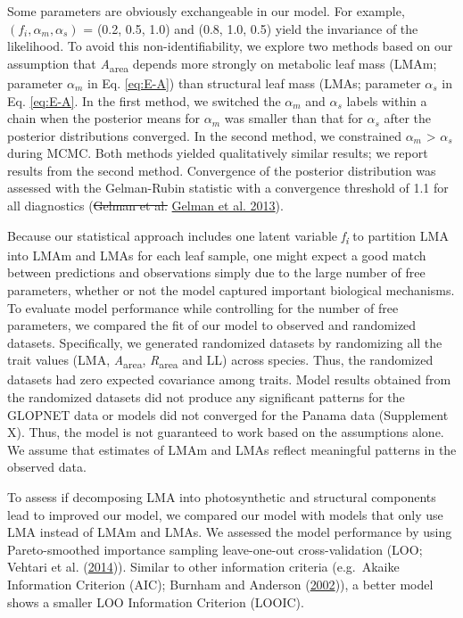 \documentclass[
  12pt,
]{article}
\providecommand{\DIFdeltex}[1]{{\protect\color{red}\sout{#1}}}                      %
\providecommand{\DIFaddbegin}{} %
\providecommand{\DIFaddend}{} %
\providecommand{\DIFdelbegin}{} %
\providecommand{\DIFdelend}{} %
\providecommand{\DIFdel}[1]{\texorpdfstring{\DIFdeltex{#1}}{}} %
\newcommand{\DIFscaledelfig}{0.5}
\newlength{\DIFdelgraphicswidth} %
\newlength{\DIFdelgraphicsheight} %
\newcommand{\DIFaddincludegraphics}[2][]{{\color{blue}\fbox{\DIFOincludegraphics[#1]{#2}}}} %
\newcommand{\DIFdelincludegraphics}[2][]{%
\sbox{\DIFdelgraphicsbox}{\DIFOincludegraphics[#1]{#2}}%
\settoboxwidth{\DIFdelgraphicswidth}{\DIFdelgraphicsbox} %
\settoboxtotalheight{\DIFdelgraphicsheight}{\DIFdelgraphicsbox} %
\scalebox{\DIFscaledelfig}{%
\parbox[b]{\DIFdelgraphicswidth}{\usebox{\DIFdelgraphicsbox}\\[-\baselineskip] \rule{\DIFdelgraphicswidth}{0em}}\llap{\resizebox{\DIFdelgraphicswidth}{\DIFdelgraphicsheight}{%
\setlength{\unitlength}{\DIFdelgraphicswidth}%
\begin{picture}(1,1)%
\thicklines\linethickness{2pt} %
{\color[rgb]{1,0,0}\put(0,0){\framebox(1,1){}}}%
{\color[rgb]{1,0,0}\put(0,0){\line( 1,1){1}}}%
{\color[rgb]{1,0,0}\put(0,1){\line(1,-1){1}}}%
\end{picture}%
}\hspace*{3pt}}} %
} %
\DeclareRobustCommand{\DIFaddbegin}{\DIFOaddbegin \let\includegraphics\DIFaddincludegraphics} %
\DeclareRobustCommand{\DIFaddend}{\DIFOaddend \let\includegraphics\DIFOincludegraphics} %
\DeclareRobustCommand{\DIFdelbegin}{\DIFOdelbegin \let\includegraphics\DIFdelincludegraphics} %
\DeclareRobustCommand{\DIFdelend}{\DIFOaddend \let\includegraphics\DIFOincludegraphics} %
\begin{document}
Some parameters are obviously exchangeable in our model.
For example, \((f_i, \alpha_m, \alpha_s)\) = (0.2, 0.5, 1.0) and (0.8, 1.0, 0.5) yield the invariance of the likelihood.
To avoid this non-identifiability, we explore two methods based on our assumption that \emph{A}\textsubscript{area} depends more strongly on metabolic leaf mass (LMAm; parameter \(\alpha_m\) in Eq. \eqref{eq:E-A}) than structural leaf mass (LMAs; parameter \(\alpha_s\) in Eq. \eqref{eq:E-A}.
In the first method, we switched the \(\alpha_m\) and \(\alpha_s\) labels within a chain when the posterior means for \(\alpha_m\) was smaller than that for \(\alpha_s\) after the posterior distributions converged.
In the second method, we constrained \(\alpha_m\) \textgreater{} \(\alpha_s\) during MCMC.
Both methods yielded qualitatively similar results; we report results from the second method.
Convergence of the posterior distribution was assessed with the Gelman-Rubin statistic with a convergence threshold of 1.1 for all diagnostics (\DIFdelbegin \DIFdel{Gelman et al. }\DIFdelend \protect\DIFdelbegin %
\DIFdelend \DIFaddbegin \hyperlink{ref-Gelman2013}{Gelman et al. 2013}\DIFaddend ).

Because our statistical approach includes one latent variable \emph{f\textsubscript{i}} to partition LMA into LMAm and LMAs for each leaf sample, one might expect a good match between predictions and observations simply due to the large number of free parameters, whether or not the model captured important biological mechanisms.
To evaluate model performance while controlling for the number of free parameters, we compared the fit of our model to observed and randomized datasets.
Specifically, we generated randomized datasets by randomizing all the trait values (LMA, \emph{A}\textsubscript{area}, \emph{R}\textsubscript{area} and LL) across species.
Thus, the randomized datasets had zero expected covariance among traits.
Model results obtained from the randomized datasets did not produce any significant patterns for the GLOPNET data or models did not converged for the Panama data (Supplement X).
Thus, the model is not guaranteed to work based on the assumptions alone.
We assume that estimates of LMAm and LMAs reflect meaningful patterns in the observed data.

To assess if decomposing LMA into photosynthetic and structural components lead to improved our model, we compared our model with models that only use LMA instead of LMAm and LMAs.
We assessed the model performance by using Pareto-smoothed importance sampling leave-one-out cross-validation (LOO; Vehtari et al. (\protect\hyperlink{ref-Vehtari2014}{2014})).
Similar to other information criteria (e.g.~Akaike Information Criterion (AIC); Burnham and Anderson (\protect\hyperlink{ref-Burnham2002}{2002})), a better model shows a smaller LOO Information Criterion (LOOIC).
\end{document}
